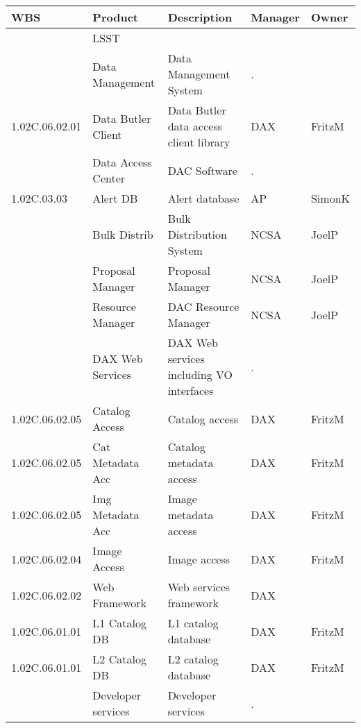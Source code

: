 \begin{longtable}{|p{}|p{}|p{}|p{}|p{}|}\hline 
 \bf WBS & Product & Description & Manager & Owner \\ \hline   
{\tiny } & \small LSST &  &  & \\ \hline 
{\tiny } & \small Data Management & Data Management System & . & \\ \hline 
{\tiny 1.02C.06.02.01} & \small Data Butler Client & Data Butler data access client library & DAX & FritzM\\ \hline 
{\tiny } & \small Data Access Center & DAC Software & . & \\ \hline 
{\tiny 1.02C.03.03} & \small Alert DB & Alert database & AP & SimonK\\ \hline 
{\tiny } & \small Bulk Distrib & Bulk Distribution System & NCSA & JoelP\\ \hline 
{\tiny } & \small Proposal Manager & Proposal Manager & NCSA & JoelP\\ \hline 
{\tiny } & \small Resource Manager & DAC Resource Manager & NCSA & JoelP\\ \hline 
{\tiny } & \small DAX Web Services & DAX Web services including VO interfaces & . & \\ \hline 
{\tiny 1.02C.06.02.05} & \small Catalog Access & Catalog access & DAX & FritzM\\ \hline 
{\tiny 1.02C.06.02.05} & \small Cat Metadata Acc & Catalog metadata access & DAX & FritzM\\ \hline 
{\tiny 1.02C.06.02.05} & \small Img Metadata Acc & Image metadata access & DAX & FritzM\\ \hline 
{\tiny 1.02C.06.02.04} & \small Image Access & Image access & DAX & FritzM\\ \hline 
{\tiny 1.02C.06.02.02} & \small Web Framework & Web services framework & DAX & \\ \hline 
{\tiny 1.02C.06.01.01} & \small L1 Catalog DB & L1 catalog database & DAX & FritzM\\ \hline 
{\tiny 1.02C.06.01.01} & \small L2 Catalog DB & L2 catalog database & DAX & FritzM\\ \hline 
{\tiny } & \small Developer services & Developer services & . & \\ \hline 

\end{longtable}
